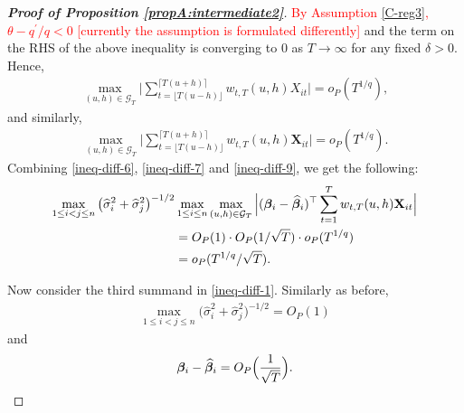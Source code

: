 \begin{proof}[\textnormal{\textbf{Proof of Proposition \ref{propA:intermediate2}}}]
\textcolor{red}{By Assumption \ref{C-reg3}, $\theta - q^\prime/q <0$ [currently the assumption is formulated differently]} and the term on the RHS of the above inequality is converging to $0$ as $T \to \infty$ for any fixed $\delta >0$. Hence, 
{\color{red}\begin{align*}
\max_{(u, h) \in \mathcal{G}_T} \bigg| \sum_{t=\lfloor T(u-h) \rfloor}^{\lceil T(u+h) \rceil} w_{t,T}(u,h)X_{it}  \bigg| = o_P(T^{1/q}),
\end{align*}
and similarly,
\begin{align}\label{ineq-diff-9}
\max_{(u, h) \in \mathcal{G}_T} \bigg| \sum_{t=\lfloor T(u-h) \rfloor}^{\lceil T(u+h) \rceil} w_{t,T}(u,h)\mathbf{X}_{it}  \bigg| = o_P(T^{1/q}).
\end{align}}
Combining \eqref{ineq-diff-6}, \eqref{ineq-diff-7} and \eqref{ineq-diff-9}, we get the following:
{\color{red}\begin{align}\label{ineq-diff-10}
\begin{split}
\max_{1\le i < j \le n} \big(\widehat{\sigma}_i^2+ \widehat{\sigma}_j^2 \big)^{-1/2}&\max_{1\le i \le n} \max_{(u,h) \in \mathcal{G}_T} \Big| (\bm{\beta}_i - \widehat{\bm{\beta}}_i)^\top\sum_{t=1}^T w_{t,T}(u,h) \mathbf{X}_{it} \Big|  \\
&=O_P(1) \cdot O_P(1/\sqrt{T}) \cdot o_P(T^{1/q}) \\
&= o_P(T^{1/q}/\sqrt{T}).
\end{split}
\end{align}}


Now consider the third summand in \eqref{ineq-diff-1}. Similarly as before, 
\begin{align}\label{ineq-diff-11}
\max_{1\le i < j \le n}\big(\widehat{\sigma}_i^2+ \widehat{\sigma}_j^2 \big)^{-1/2}  = O_P(1)
\end{align}
and
\begin{align}\label{ineq-diff-12}
\bm{\beta}_i - \widehat{\bm{\beta}}_i = O_P\Big(\frac{1}{\sqrt{T}}\Big).
\end{align}


\end{proof}
